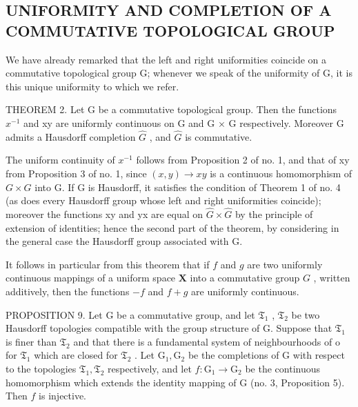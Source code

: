 \subsection{UNIFORMITY AND COMPLETION OF A COMMUTATIVE TOPOLOGICAL GROUP}

We have already remarked that the left and right uniformities coincide on a commutative topological group G; whenever we speak of the uniformity of G, it is this unique uniformity to which we refer.

THEOREM 2. Let G be a commutative topological group. Then the functions \(x^{-1}\) and xy are uniformly continuous on G and G × G respectively. Moreover G admits a Hausdorff completion \(\hat{G}\) , and \(\hat{G}\) is commutative.

The uniform continuity of \(x^{-1}\) follows from Proposition 2 of no. 1, and that of xy from Proposition 3 of no. 1, since \((x, y) \to xy\) is a continuous homomorphism of \(G \times G\) into G. If G is Hausdorff, it satisfies the condition of Theorem 1 of no. 4 (as does every Hausdorff group whose left and right uniformities coincide); moreover the functions xy and yx are equal on \(\hat{G} \times \hat{G}\) by the principle of extension of identities; hence the second part of the theorem, by considering in the general case the Hausdorff group associated with G.

It follows in particular from this theorem that if \(f\) and \(g\) are two uniformly continuous mappings of a uniform space \(\mathbf{X}\) into a commutative group \(G\) , written additively, then the functions \(-f\) and \(f + g\) are uniformly continuous.

PROPOSITION 9. Let G be a commutative group, and let \(\mathfrak{T}_1\) , \(\mathfrak{T}_2\) be two Hausdorff topologies compatible with the group structure of G. Suppose that \(\mathfrak{T}_1\) is finer than \(\mathfrak{T}_2\) and that there is a fundamental system of neighbourhoods of o for \(\mathfrak{T}_1\) which are closed for \(\mathfrak{T}_2\) . Let \(\mathrm{G}_1, \mathrm{G}_2\) be the completions of G with respect to the topologies \(\mathfrak{T}_1, \mathfrak{T}_2\) respectively, and let \(f: \mathrm{G}_1 \to \mathrm{G}_2\) be the continuous homomorphism which extends the identity mapping of G (no. 3, Proposition 5). Then \(f\) is injective.

